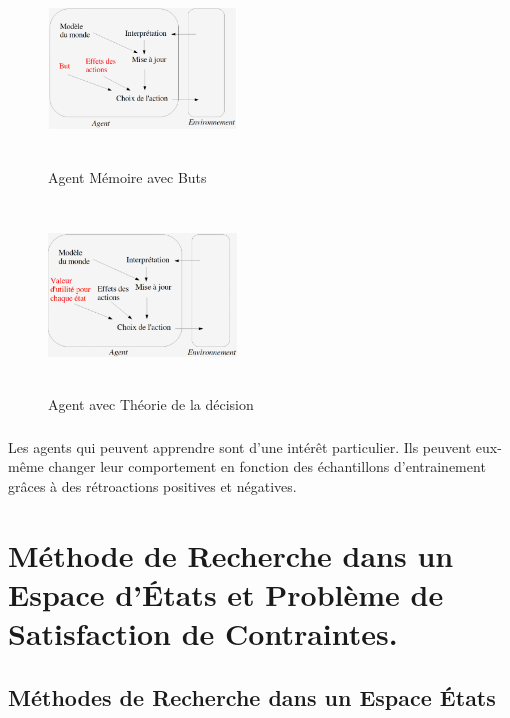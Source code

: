 \documentclass[oneside]{book}
\begin{document}
\begin{figure}[!ht]
\centering
\includegraphics[width=5cm, height=5cm, keepaspectratio]{Agent_Memoire_But.png}
\caption{Agent Mémoire avec Buts}
\label{fig:agentmembut}
\end{figure}
	
\begin{figure}[!ht]
\centering
\includegraphics[width=5cm, height=5cm, keepaspectratio]{Agent_Memoire_Theorie.png}
\caption{Agent avec Théorie de la décision}
\label{fig:agenttheorie}
\end{figure}
\paragraph{}
Les agents qui peuvent apprendre sont d'une intérêt particulier. Ils peuvent eux-même changer leur comportement en fonction des échantillons d'entrainement grâces à des rétroactions positives et négatives.
\chapter{Méthode de Recherche dans un Espace d'États et Problème de Satisfaction de Contraintes.}
\section{Méthodes de Recherche dans un Espace États}
\end{document}
